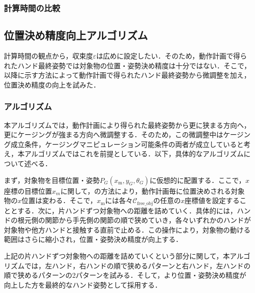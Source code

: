 \documentclass[a4paper,twoside,12pt,papersize, dvipdfmx]{iirthesis}
\begin{document}
\subsubsection{計算時間の比較}


\subsection{位置決め精度向上アルゴリズム}{\label{subsec::planner::formclosure}
計算時間の観点から，収束度$\varepsilon$は広めに設定したい．そのため，動作計画で得られたハンド最終姿勢では対象物の位置・姿勢決め精度は十分ではない．そこで，以降に示す方法によって動作計画で得られたハンド最終姿勢から微調整を加え，位置決め精度の向上を試みた．
\subsubsection{アルゴリズム}
本アルゴリズムでは，動作計画により得られた最終姿勢から更に狭まる方向へ，更にケージングが強まる方向へ微調整する．そのため，この微調整中はケージング成立条件，ケージングマニピュレーション可能条件の両者が成立していると考え，本アルゴリズムではこれを前提としている．以下，具体的なアルゴリズムについて述べる．\par
まず，対象物を目標位置・姿勢$P_G (x_{\mathrm m}, y_G, \theta_G)$に仮想的に配置する．ここで，$x$座標の目標位置$x_m$に関して，の方法により，動作計画毎に位置決めされる対象物の$x$位置は変わる．そこで，$x_{\mathrm m}$には各々$\mathcal{C}_{\mathrm{free\_obj}}$の任意の$x$座標値を設定することとする．次に，片ハンドずつ対象物への距離を詰めていく．具体的には，ハンドの根元側の関節から手先側の関節の順で狭めていき，各々いずれかのハンドが対象物や他方ハンドと接触する直前で止める．この操作により，対象物の動ける範囲はさらに縮小され，位置・姿勢決め精度が向上する．\par
上記の片ハンドずつ対象物への距離を詰めていくという部分に関して，本アルゴリズムでは，左ハンド，右ハンドの順で狭めるパターンと右ハンド，左ハンドの順で狭めるパターンの2パターンを試みる．そして，より位置・姿勢決め精度が向上した方を最終的なハンド姿勢として採用する．

}
\end{document}
